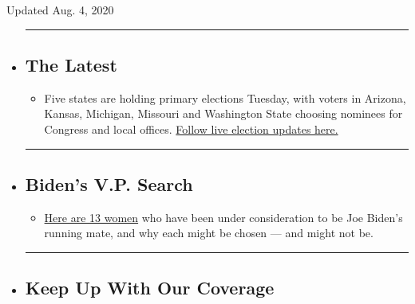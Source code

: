 Updated Aug. 4, 2020

\begin{itemize}
\item
  \begin{center}\rule{0.5\linewidth}{\linethickness}\end{center}

  \hypertarget{the-latest}{%
  \subsection{The Latest}\label{the-latest}}

  \begin{itemize}
  \tightlist
  \item
    Five states are holding primary elections Tuesday, with voters in
    Arizona, Kansas, Michigan, Missouri and Washington State choosing
    nominees for Congress and local offices.
    \href{https://www.nytimes3xbfgragh.onion/2020/08/04/us/elections/primary-election-michigan-arizona-kansas.html?action=click\&pgtype=Article\&state=default\&region=BELOW_MAIN_CONTENT\&context=storylines_guide}{Follow
    live election updates here.}
  \end{itemize}
\item
  \begin{center}\rule{0.5\linewidth}{\linethickness}\end{center}

  \hypertarget{bidens-vp-search}{%
  \subsection{Biden's V.P. Search}\label{bidens-vp-search}}

  \begin{itemize}
  \tightlist
  \item
    \href{https://www.nytimes3xbfgragh.onion/article/biden-vice-president-2020.html?action=click\&pgtype=Article\&state=default\&region=BELOW_MAIN_CONTENT\&context=storylines_guide}{Here
    are 13 women} who have been under consideration to be Joe Biden's
    running mate, and why each might be chosen --- and might not be.
  \end{itemize}
\item
  \begin{center}\rule{0.5\linewidth}{\linethickness}\end{center}

  \hypertarget{keep-up-with-our-coverage}{%
  \subsection{Keep Up With Our
  Coverage}\label{keep-up-with-our-coverage}}


\end{itemize}
